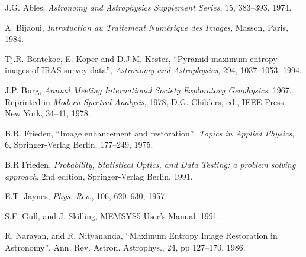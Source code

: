 \documentclass[11pt,a4paper]{article}
\begin{document}
\begin{thebibliography}{99}
 J.G. Ables, {\it Astronomy and Astrophysics Supplement Series},
15, 383--393, 1974.
 
 A. Bijaoui, {\it Introduction au 
Traitement Num\'erique des Images}, Masson, Paris, 1984.


 Tj.R. Bontekoe, E. Koper and D.J.M. Kester,   
``Pyramid maximum entropy images of IRAS survey data'', {\it Astronomy and
 Astrophysics}, 294, 1037--1053, 1994.

 J.P. Burg, {\it 
Annual Meeting International Society Exploratory Geophysics}, 1967. 
Reprinted in {\it Modern Spectral Analysis}, 1978, D.G. Childers, ed., 
IEEE Press, New York, 34--41, 1978.



 B.R. Frieden, ``Image enhancement and restoration'', 
 {\it Topics in Applied Physics}, 6,  Springer-Verlag Berlin, 177--249, 1975.

 B.R Frieden, {\it Probability, Statistical Optics, and
Data Testing: a problem solving approach}, 2nd edition, Springer-Verlag Berlin, 
1991.

 E.T. Jaynes, {\it Phys. Rev.}, 106, 620--630, 1957.


 S.F. Gull, and J. Skilling, MEMSYS5 User's Manual, 1991.

 R. Narayan, and R. Nityananda, ``Maximum 
Entropy Image Restoration in Astronomy'', Ann. Rev. Astron. Astrophys., 
24, pp 127--170, 1986.


\end{thebibliography}
\end{document}

